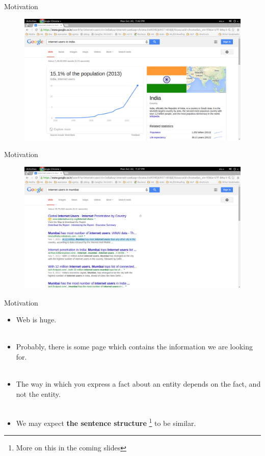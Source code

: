 \documentclass{beamer}
\begin{document}
\begin{frame}{Motivation}
 \begin{figure}[h]
 \centering
 \includegraphics[bb=0 0 1366 741,scale=0.25]{images/resultindia.png}
\end{figure}
\end{frame}

\begin{frame}{Motivation}
 \begin{figure}[h]
 \centering
 \includegraphics[bb=0 0 1366 741,scale=0.25]{images/resultmumbai.png}
\end{figure}
\end{frame}

\begin{frame}{Motivation}

\begin{itemize}
 \item  Web is huge.  \\~\\
 \item Probably, there is some page which contains the information we are looking for.  \\~\\
 \item The way in which you express a fact about an entity depends on the fact, and not the entity.  \\~\\
 \item We may expect \textbf{the sentence structure} \footnote{More on this in the coming slides} to be similar.
\end{itemize}
\end{frame}
\end{document}
